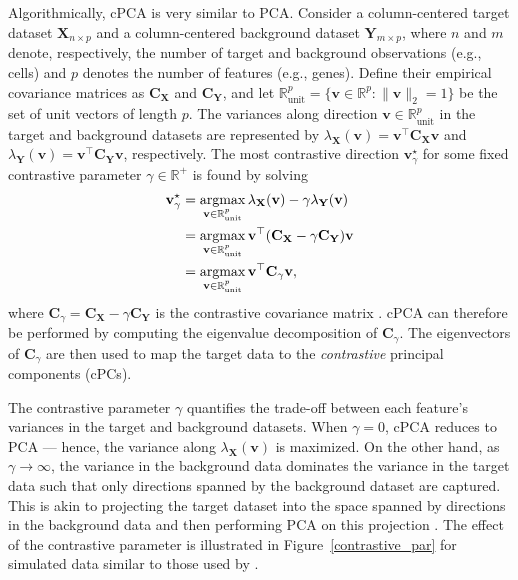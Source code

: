 Algorithmically, cPCA is very similar to PCA. Consider a column-centered target dataset $\mathbf{X}_{n \times p}$ and a column-centered background dataset $\mathbf{Y}_{m \times p}$, where $n$ and $m$ denote, respectively, the number of target and background observations (e.g., cells) and $p$ denotes the number of features (e.g., genes). Define their empirical covariance matrices as $\mathbf{C_X}$ and $\mathbf{C_Y}$, and let $\mathbb{R}_{\text{unit}}^p=\{\mathbf{v} \in \mathbb{R}^p: \lVert\mathbf{v}\rVert_2 = 1\}$ be the set of unit vectors of length $p$. The variances along direction $\mathbf{v} \in \mathbb{R}_{\text{unit}}^p$ in the target and background datasets are represented by $\lambda_{\mathbf{X}}(\mathbf{v}) = \mathbf{v}^\top\mathbf{C_X}\mathbf{v}$ and $\lambda_{\mathbf{Y}}(\mathbf{v}) = \mathbf{v}^\top\mathbf{C_Y}\mathbf{v}$, respectively. The most contrastive direction $\mathbf{v}^{\star}_\gamma$ for some fixed contrastive parameter $\gamma \in \mathbb{R}^+$ is found by solving
\begin{equation}
    \begin{aligned}
  \mathbf{v}^{\star}_\gamma & = \operatorname*{argmax}_{\mathbf{v} \in \mathbb{R}_{\text{unit}}^p}
  \lambda_{\mathbf{X}}(\mathbf{v})-
    \gamma \lambda_{\mathbf{Y}}(\mathbf{v}) \\
  & = \operatorname*{argmax}_{\mathbf{v} \in \mathbb{R}_{\text{unit}}^p}
    \mathbf{v}^\top(\mathbf{C_X} - \gamma\mathbf{C_Y})\mathbf{v} \\
  & = \operatorname*{argmax}_{\mathbf{v} \in \mathbb{R}_{\text{unit}}^p}
    \mathbf{v}^\top\mathbf{C}_{\gamma}\mathbf{v},
\end{aligned}
\end{equation}
where $\mathbf{C}_{\gamma} =  \mathbf{C_X} - \gamma\mathbf{C_Y}$ is the contrastive covariance matrix \citep{Abid2018}. cPCA can therefore be performed by computing the eigenvalue decomposition of $\mathbf{C}_{\gamma}$. The eigenvectors of $\mathbf{C}_{\gamma}$ are then used to map the target data to the \textit{contrastive} principal components (cPCs).

The contrastive parameter $\gamma$ quantifies the trade-off between each feature's variances in the target and background datasets. When $\gamma = 0$, cPCA reduces to PCA --- hence, the variance along $\lambda_{\mathbf{X}}(\mathbf{v})$ is maximized. On the other hand, as $\gamma \rightarrow \infty$, the variance in the background data dominates the variance in the target data such that only directions spanned by the background dataset are captured. This is akin to projecting the target dataset into the space spanned by directions in the background data and then performing PCA on this projection \citep{Abid2018}. The effect of the contrastive parameter is illustrated in Figure~\ref{contrastive_par} for simulated data similar to those used by \citet{Abid2018}.

